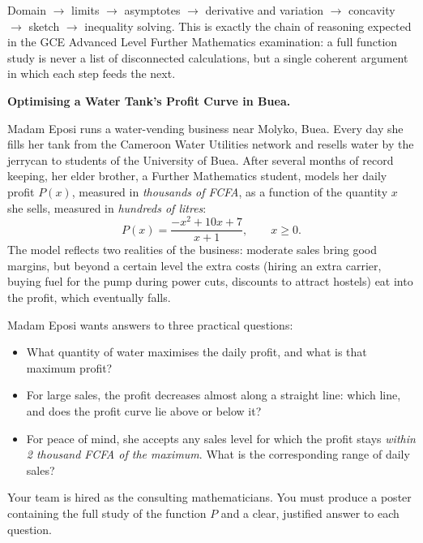 \documentclass[11pt]{article}
\newcommand{\cle}[1]{{\popxbold\color{popdark}#1}}
\newcounter{popsec}
\newcounter{popsub}
\newcommand{\courssub}[1]{%
  \stepcounter{popsub}%
  \par\vspace{9pt}\noindent{\popxbold\fontsize{11.5}{13}\selectfont\color{popink}{\color{poporange}\thepopsec.\thepopsub}\hspace{6pt}#1}\par\nopagebreak\vspace{4pt}
}
\begin{document}
\begin{aretenir}
Domain $\to$ limits $\to$ asymptotes $\to$ derivative and variation $\to$ concavity $\to$ sketch $\to$ inequality solving. This is exactly the chain of reasoning expected in the GCE Advanced Level Further Mathematics examination: a full function study is never a list of disconnected calculations, but a single coherent argument in which each step feeds the next.
\end{aretenir}

\courssub{Situation}

\textbf{Optimising a Water Tank's Profit Curve in Buea.}\par
Madam Eposi runs a water-vending business near Molyko, Buea. Every day she fills her tank from the Cameroon Water Utilities network and resells water by the jerrycan to students of the University of Buea. After several months of record keeping, her elder brother, a Further Mathematics student, models her \cle{daily profit} $P(x)$, measured in \emph{thousands of FCFA}, as a function of the quantity $x$ she sells, measured in \emph{hundreds of litres}:
\[
P(x)=\frac{-x^{2}+10x+7}{x+1},\qquad x\ge 0.
\]
The model reflects two realities of the business: moderate sales bring good margins, but beyond a certain level the extra costs (hiring an extra carrier, buying fuel for the pump during power cuts, discounts to attract hostels) eat into the profit, which eventually falls.

Madam Eposi wants answers to three practical questions:
\begin{itemize}
\item What quantity of water maximises the daily profit, and what is that maximum profit?
\item For large sales, the profit decreases almost along a straight line: which line, and does the profit curve lie above or below it?
\item For peace of mind, she accepts any sales level for which the profit stays \emph{within 2 thousand FCFA of the maximum}. What is the corresponding range of daily sales?
\end{itemize}

Your team is hired as the consulting mathematicians. You must produce a poster containing the full study of the function $P$ and a clear, justified answer to each question.

\courssub{Tasks}
\end{document}
